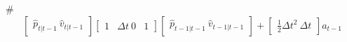 # $$
\begin{bmatrix}
\hat p_{t|t-1}\
\hat v_{t|t-1}
\end{bmatrix}

\begin{bmatrix}
1 & \Delta t\
0 & 1
\end{bmatrix}
\begin{bmatrix}
\hat p_{t-1|t-1}\
\hat v_{t-1|t-1}
\end{bmatrix}
+
\begin{bmatrix}
\frac{1}{2}\Delta t^2\
\Delta t
\end{bmatrix}
a_{t-1}
$$
